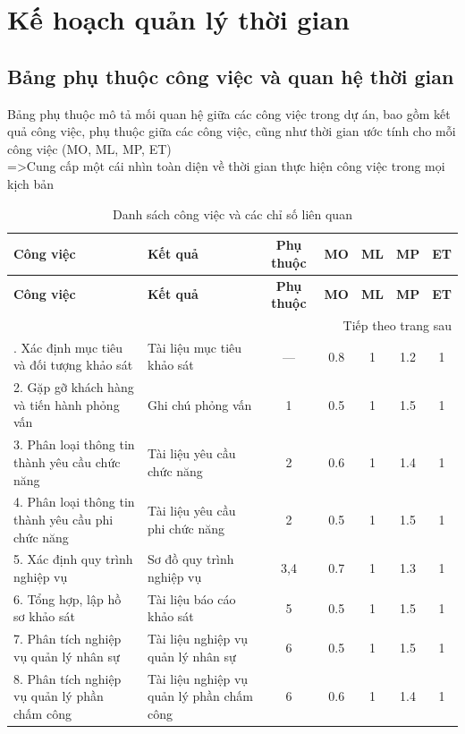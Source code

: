 \section{Kế hoạch quản lý thời gian}
\subsection{Bảng phụ thuộc công việc và quan hệ thời gian}
    \noindent Bảng phụ thuộc mô tả mối quan hệ giữa các công việc trong dự án, bao gồm kết quả công việc, phụ thuộc giữa các công việc, cũng như thời gian ước tính cho mỗi công việc (MO, ML, MP, ET)\\
    \noindent =>Cung cấp một cái nhìn toàn diện về thời gian thực hiện công việc trong mọi kịch bản    
\begin{longtable}{|p{5cm}|p{5cm}|c|c|c|c|c|}
    \caption{Danh sách công việc và các chỉ số liên quan} \\ \hline
    \textbf{Công việc} & \textbf{Kết quả} & \textbf{Phụ thuộc} & \textbf{MO} & \textbf{ML} & \textbf{MP} & \textbf{ET} \\ \hline
    \endfirsthead
    \hline
    \textbf{Công việc} & \textbf{Kết quả} & \textbf{Phụ thuộc} & \textbf{MO} & \textbf{ML} & \textbf{MP} & \textbf{ET} \\ \hline
    \endhead
    \hline \multicolumn{7}{|r|}{{Tiếp theo trang sau}} \\ \hline
    \endfoot
    \hline
    \endlastfoot
    1. Xác định mục tiêu và đối tượng khảo sát & Tài liệu mục tiêu khảo sát & — & 0.8 & 1 & 1.2 & 1 \\ \hline
    2. Gặp gỡ khách hàng và tiến hành phỏng vấn & Ghi chú phỏng vấn & 1 & 0.5 & 1 & 1.5 & 1 \\ \hline
    3. Phân loại thông tin thành yêu cầu chức năng & Tài liệu yêu cầu chức năng & 2 & 0.6 & 1 & 1.4 & 1 \\ \hline
    4. Phân loại thông tin thành yêu cầu phi chức năng & Tài liệu yêu cầu phi chức năng & 2 & 0.5 & 1 & 1.5 & 1 \\ \hline
    5. Xác định quy trình nghiệp vụ & Sơ đồ quy trình nghiệp vụ & 3,4 & 0.7 & 1 & 1.3 & 1 \\ \hline
    6. Tổng hợp, lập hồ sơ khảo sát & Tài liệu báo cáo khảo sát & 5 & 0.5 & 1 & 1.5 & 1 \\ \hline
    7. Phân tích nghiệp vụ quản lý nhân sự & Tài liệu nghiệp vụ quản lý nhân sự & 6 & 0.5 & 1 & 1.5 & 1 \\ \hline
    8. Phân tích nghiệp vụ quản lý phần chấm công & Tài liệu nghiệp vụ quản lý phần chấm công & 6 & 0.6 & 1 & 1.4 & 1 \\ \hline

\end{longtable}
